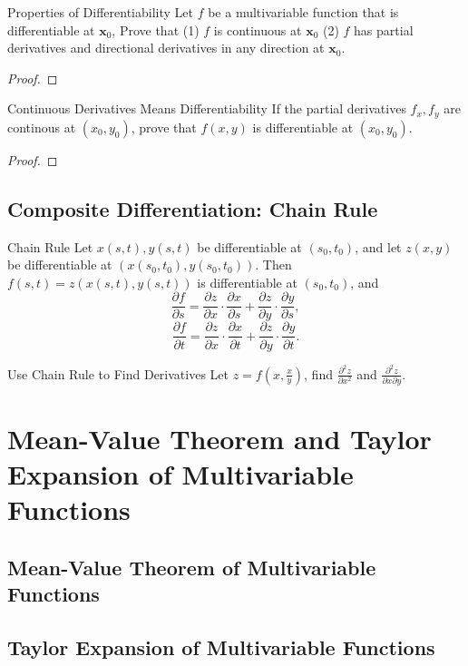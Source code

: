 \begin{example}{Properties of Differentiability}{}
  Let $f$ be a multivariable function that is differentiable at $\mathbf{x}_0$,
  Prove that (1) $f$ is continuous at $\mathbf{x}_0$
  (2) $f$ has partial derivatives and directional derivatives in any direction
  at $\mathbf{x}_0$.
\end{example}

\begin{proof}
  
\end{proof}

\begin{example}{Continuous Derivatives Means Differentiability}{}
  If the partial derivatives $f_x, f_y$ are continous at $(x_0, y_0)$,
  prove that $f(x,y)$ is differentiable at $(x_0, y_0)$.
\end{example}

\begin{proof}
  
\end{proof}

\subsection{Composite Differentiation: Chain Rule}

\begin{theorem}{Chain Rule}{}
  Let $x(s,t), y(s,t)$ be differentiable at $(s_0, t_0)$,
  and let $z(x, y)$ be differentiable at $(x(s_0, t_0), y(s_0,t_0))$.
  Then $f(s,t) = z(x(s,t), y(s,t))$ is differentiable at $(s_0,t_0)$, and
  \begin{equation}
    \frac{\partial f}{\partial s} = \frac{\partial z}{\partial x} \cdot \frac{\partial x}{\partial s} + \frac{\partial z}{\partial y} \cdot \frac{\partial y}{\partial s},
  \end{equation}
  \begin{equation}
    \frac{\partial f}{\partial t} = \frac{\partial z}{\partial x} \cdot \frac{\partial x}{\partial t} + \frac{\partial z}{\partial y} \cdot \frac{\partial y}{\partial t}.
  \end{equation}
\end{theorem}

\begin{example}{Use Chain Rule to Find Derivatives}{}
  Let $z = f \left( x, \frac{x}{y} \right)$, find $\frac{\partial^2 z}{\partial
    x^2}$ and $\frac{\partial^2 z}{\partial x\partial y}$.
\end{example}



\section{Mean-Value Theorem and Taylor Expansion of Multivariable Functions}

\subsection{Mean-Value Theorem of Multivariable Functions}

\subsection{Taylor Expansion of Multivariable Functions}








